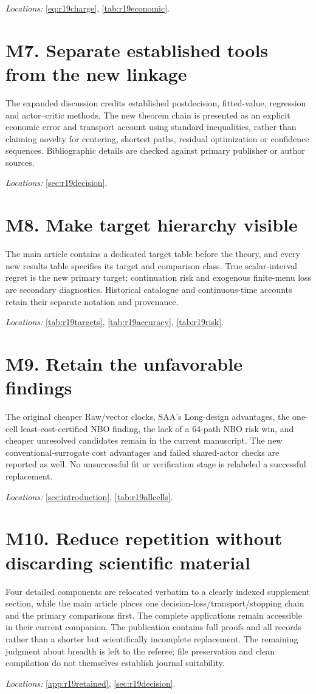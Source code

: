 \documentclass[ecta,nameyear,draft]{econsocart}
\theoremstyle{definition}
\theoremstyle{remark}
\begin{document}
\noindent\emph{Locations:} \ref{eq:r19charge}, \ref{tab:r19economic}.

\section*{M7. Separate established tools from the new linkage}
The expanded discussion credits established postdecision, fitted-value, regression and actor--critic methods. The new theorem chain is presented as an explicit economic error and transport account using standard inequalities, rather than claiming novelty for centering, shortest paths, residual optimization or confidence sequences. Bibliographic details are checked against primary publisher or author sources.

\noindent\emph{Locations:} \ref{sec:r19decision}.

\section*{M8. Make target hierarchy visible}
The main article contains a dedicated target table before the theory, and every new results table specifies its target and comparison class. True scalar-interval regret is the new primary target; continuation risk and exogenous finite-menu loss are secondary diagnostics. Historical catalogue and continuous-time accounts retain their separate notation and provenance.

\noindent\emph{Locations:} \ref{tab:r19targets}, \ref{tab:r19accuracy}, \ref{tab:r19risk}.

\section*{M9. Retain the unfavorable findings}
The original cheaper Raw/vector clocks, SAA's Long-design advantages, the one-cell least-cost-certified NBO finding, the lack of a 64-path NBO risk win, and cheaper unresolved candidates remain in the current manuscript. The new conventional-surrogate cost advantages and failed shared-actor checks are reported as well. No unsuccessful fit or verification stage is relabeled a successful replacement.

\noindent\emph{Locations:} \ref{sec:introduction}, \ref{tab:r19allcells}.

\section*{M10. Reduce repetition without discarding scientific material}
Four detailed components are relocated verbatim to a clearly indexed supplement section, while the main article places one decision-loss/transport/stopping chain and the primary comparisons first. The complete applications remain accessible in their current companion. The publication contains full proofs and all records rather than a shorter but scientifically incomplete replacement. The remaining judgment about breadth is left to the referee; file preservation and clean compilation do not themselves establish journal suitability.

\noindent\emph{Locations:} \ref{app:r19retained}, \ref{sec:r19decision}.
\end{document}
